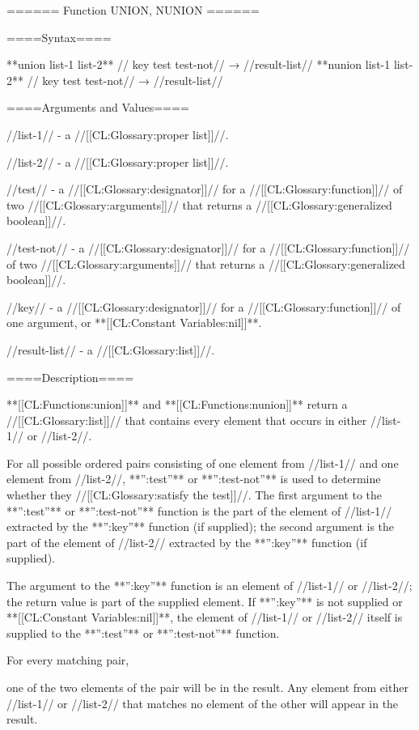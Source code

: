 ====== Function UNION, NUNION ======

====Syntax====

**union {list-1 list-2** //\key} key test test-not// → //result-list// **nunion {list-1 list-2** //\key} key test test-not// → //result-list//

====Arguments and Values====

//list-1// - a //[[CL:Glossary:proper list]]//.

//list-2// - a //[[CL:Glossary:proper list]]//.

//test// - a //[[CL:Glossary:designator]]// for a //[[CL:Glossary:function]]// of two //[[CL:Glossary:arguments]]// that returns a //[[CL:Glossary:generalized boolean]]//.

//test-not// - a //[[CL:Glossary:designator]]// for a //[[CL:Glossary:function]]// of two //[[CL:Glossary:arguments]]// that returns a //[[CL:Glossary:generalized boolean]]//.

//key// - a //[[CL:Glossary:designator]]// for a //[[CL:Glossary:function]]// of one argument, or **[[CL:Constant Variables:nil]]**.

//result-list// - a //[[CL:Glossary:list]]//.

====Description====

**[[CL:Functions:union]]** and **[[CL:Functions:nunion]]** return a //[[CL:Glossary:list]]// that contains every element that occurs in either //list-1// or //list-2//.

For all possible ordered pairs consisting of one element from //list-1// and one element from //list-2//, **'':test''** or **'':test-not''** is used to determine whether they //[[CL:Glossary:satisfy the test]]//. The first argument to the **'':test''** or **'':test-not''** function is the part of the element of //list-1// extracted by the **'':key''** function (if supplied); the second argument is the part of the element of //list-2// extracted by the **'':key''** function (if supplied).

The argument to the **'':key''** function is an element of //list-1// or //list-2//; the return value is part of the supplied element. If **'':key''** is not supplied or **[[CL:Constant Variables:nil]]**, the element of //list-1// or //list-2// itself is supplied to the **'':test''** or **'':test-not''** function.

For every matching pair,

one of the two elements of the pair will be in the result. Any element from either //list-1// or //list-2// that matches no element of the other will appear in the result.

